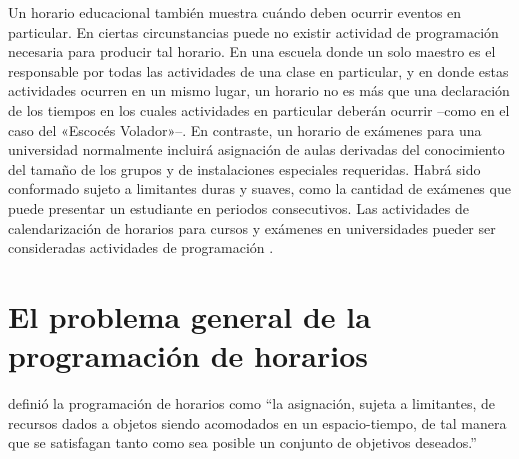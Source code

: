 \documentclass[draft,12pt,headsepline,footsepline,paper=letter]{scrreprt}
\begin{document}
Un horario educacional también muestra cuándo deben ocurrir eventos en particular. En ciertas circunstancias puede no existir actividad de programación necesaria para producir tal horario. En una escuela donde un solo maestro es el responsable por todas las actividades de una clase en particular, y en donde estas actividades ocurren en un mismo lugar, un horario no es más que una declaración de los tiempos en los cuales actividades en particular deberán ocurrir –como en el caso del «Escocés Volador»–. En contraste, un horario de exámenes para una universidad normalmente incluirá asignación de aulas derivadas del conocimiento del tamaño de los grupos y de instalaciones especiales requeridas. Habrá sido conformado sujeto a limitantes duras y suaves, como la cantidad de exámenes que puede presentar un estudiante en periodos consecutivos. Las actividades de calendarización de horarios para cursos y exámenes en universidades pueder ser consideradas actividades de programación \citep[p.~49]{burke04timetabling-and-rostering}.

\section{El problema general de la programación de horarios}
\label{sec:problema_general_programacion_horarios}

\citet[p.~53]{wren95scheduling-timetabling} definió la programación de horarios como “la asignación, sujeta a limitantes, de recursos dados a objetos siendo acomodados en un espacio-tiempo, de tal manera que se satisfagan tanto como sea posible un conjunto de objetivos deseados.”
\end{document}
